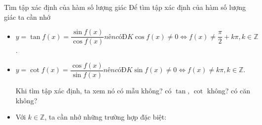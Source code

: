\begin{dang}{Tìm tập xác định của hàm số lượng giác}
	Để tìm tập xác định của hàm số lượng giác ta cần nhớ
	\begin{itemize}
		\item $y=\tan f(x)=\dfrac{\sin f(x)}{\cos f(x)} nên có ĐK \cos f(x)\neq 0 \Leftrightarrow f(x)\neq \dfrac{\pi}{2}+k\pi, k\in \mathbb{Z}$.
		\item $y=\cot f(x)=\dfrac{\cos f(x)}{\sin f(x)} nên có ĐK \sin f(x)\neq 0 \Leftrightarrow f(x)\neq k\pi, k\in \mathbb{Z}$.		
		\begin{note}
			Khi tìm tập xác định, ta xem nó có mẫu không? có $\tan,\, \cot$ không? có căn không?
		\end{note}
		\item Với $k\in \mathbb{Z}$, ta cần nhớ những trường hợp đặc biệt:
	\end{itemize}
\end{dang}
